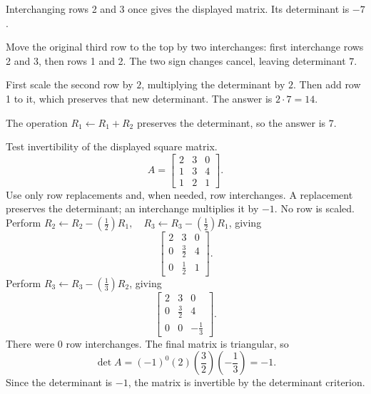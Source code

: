 Interchanging rows 2 and 3 once gives the displayed matrix. Its determinant is $-7$.

Move the original third row to the top by two interchanges: first interchange rows 2 and 3, then rows 1 and 2. The two sign changes cancel, leaving determinant $7$.

First scale the second row by $2$, multiplying the determinant by $2$. Then add row 1 to it, which preserves that new determinant. The answer is $2\cdot7=14$.

The operation $R_1\leftarrow R_1+R_2$ preserves the determinant, so the answer is $7$.

\goal Test invertibility of the displayed square matrix.
\[A=\begin{bmatrix}2&3&0\\1&3&4\\1&2&1\end{bmatrix}.\]
Use only row replacements and, when needed, row interchanges. A replacement preserves the determinant; an interchange multiplies it by $-1$. No row is scaled.
Perform $R_2\leftarrow R_2-(\frac{1}{2})R_1,\quad R_3\leftarrow R_3-(\frac{1}{2})R_1$, giving
\[
\begin{bmatrix}2&3&0\\0&\frac{3}{2}&4\\0&\frac{1}{2}&1\end{bmatrix}.
\]
Perform $R_3\leftarrow R_3-(\frac{1}{3})R_2$, giving
\[
\begin{bmatrix}2&3&0\\0&\frac{3}{2}&4\\0&0&- \frac{1}{3}\end{bmatrix}.
\]
There were $0$ row interchanges. The final matrix is triangular, so
\[\det A=(-1)^{0}(2)(\frac{3}{2})(- \frac{1}{3})=-1.\]
Since the determinant is $-1$, the matrix is invertible by the determinant criterion.

